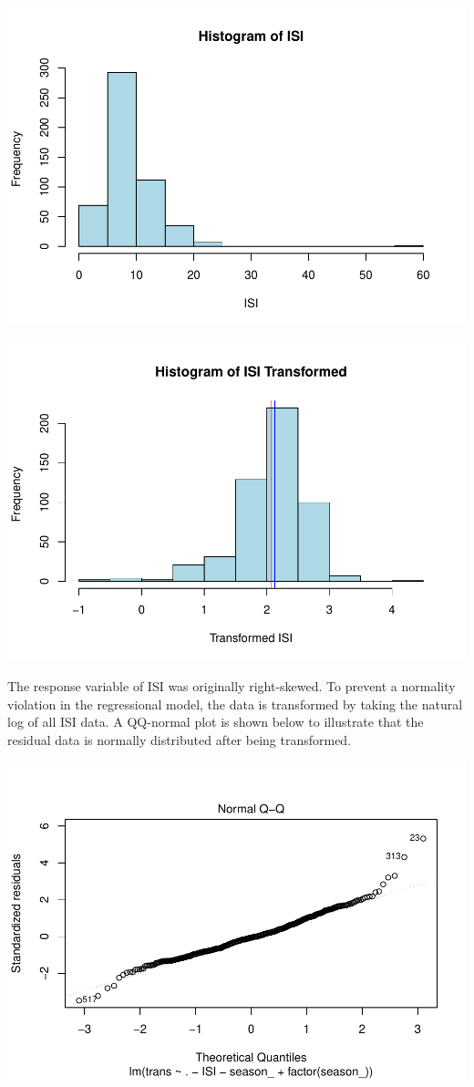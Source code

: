 \documentclass[conference,final,]{IEEEtran}
\makeatletter
\def\maxwidth{\ifdim\Gin@nat@width>\linewidth\linewidth
\else\Gin@nat@width\fi}
\let\Oldincludegraphics\includegraphics
\renewcommand{\includegraphics}[1]{\Oldincludegraphics[width=\maxwidth]{#1}}
\makeatother
\begin{document}
\includegraphics{forest_fires_files/figure-latex/unnamed-chunk-1-1.pdf}

\includegraphics{forest_fires_files/figure-latex/transform-1.pdf}

The response variable of ISI was originally right-skewed. To prevent a
normality violation in the regressional model, the data is transformed
by taking the natural log of all ISI data. A QQ-normal plot is shown
below to illustrate that the residual data is normally distributed after
being transformed.

\includegraphics{forest_fires_files/figure-latex/unnamed-chunk-2-1.pdf}
\end{document}
